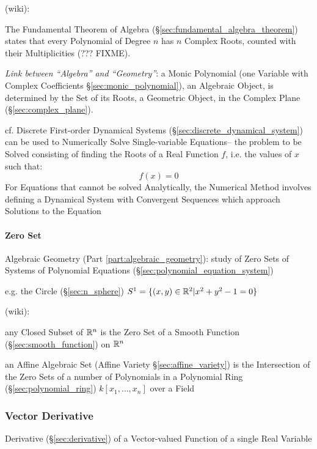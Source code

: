 (wiki):

The Fundamental Theorem of Algebra (\S\ref{sec:fundamental_algebra_theorem})
states that every Polynomial of Degree $n$ has $n$ Complex Roots, counted with
their Multiplicities (??? FIXME).

\emph{Link between ``Algebra'' and ``Geometry''}: a Monic Polynomial (one
Variable with Complex Coefficients \S\ref{sec:monic_polynomial}), an Algebraic
Object, is determined by the Set of its Roots, a Geometric Object, in the
Complex Plane (\S\ref{sec:complex_plane}).

\asterism

\fist cf. Discrete First-order Dynamical Systems
(\S\ref{sec:discrete_dynamical_system}) can be used to Numerically Solve
Single-variable Equations-- the problem to be Solved consisting of finding the
Roots of a Real Function $f$, i.e. the values of $x$ such that:
\[
  f(x) = 0
\]
For Equations that cannot be solved Analytically, the Numerical Method involves
defining a Dynamical System with Convergent Sequences which approach Solutions
to the Equation



\paragraph{Zero Set}\label{sec:zero_set}\hfill

\fist Algebraic Geometry (Part \ref{part:algebraic_geometry}): study of Zero
Sets of Systems of Polynomial Equations
(\S\ref{sec:polynomial_equation_system})

e.g. the Circle (\S\ref{sec:n_sphere}) $S^1 = \{ (x,y) \in \mathbb{R}^2 | x^2 + y^2
- 1 = 0 \}$

(wiki):

any Closed Subset of $\mathbb{R}^n$ is the Zero Set of a Smooth Function
(\S\ref{sec:smooth_function}) on $\mathbb{R}^n$

an Affine Algebraic Set (Affine Variety \S\ref{sec:affine_variety}) is the
Intersection of the Zero Sets of a number of Polynomials in a Polynomial Ring
(\S\ref{sec:polynomial_ring}) $k[x_1,\ldots,x_n]$ over a Field



\subsubsection{Vector Derivative}\label{sec:vector_derivative}

Derivative (\S\ref{sec:derivative}) of a Vector-valued Function of a single Real
Variable


